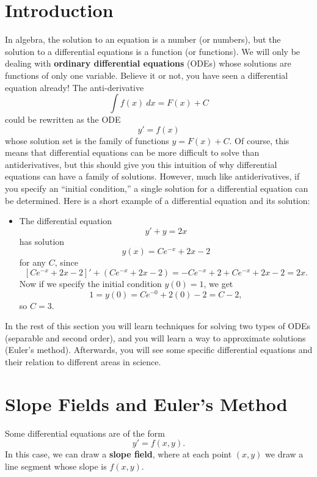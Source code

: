 
\section{Introduction}

In algebra, the solution to an equation is a number (or numbers), but the solution to a differential equations is a function (or functions). We will only be dealing with \textbf{ordinary differential equations} (ODEs) whose solutions are functions of only one variable. Believe it or not, you have seen a differential equation already! The anti-derivative
$$\int f(x)\ dx = F(x)+C$$
could be rewritten as the ODE
$$y' = f(x)$$
whose solution set is the family of functions $y=F(x)+C$. Of course, this means that differential equations can be more difficult to solve than antiderivatives, but this should give you this intuition of why differential equations can have a family of solutions. However, much like antiderivatives, if you specify an ``initial condition,'' a single solution for a differential equation can be determined. Here is a short example of a differential equation and its solution:
\begin{itemize}
\item The differential equation
$$y' + y = 2x$$
has solution 
$$y(x) = C e^{-x} + 2 x - 2$$
for any $C$, since
$$
\left[C e^{-x} + 2 x - 2\right]'+\left(C e^{-x} + 2 x - 2\right)=
-C e^{-x} + 2+ C e^{-x} + 2 x - 2 = 2x.
$$
Now if we specify the initial condition $y(0)=1$, we get
$$ 1=y(0)=C e^{-0} + 2 (0) - 2 = C - 2,$$
so $C=3$.
\end{itemize}

In the rest of this section you will learn techniques for solving two types of ODEs (separable and second order), and you will learn a way to approximate solutions (Euler's method). Afterwards, you will see some specific differential equations and their relation to different areas in science.


\section{Slope Fields and Euler's Method}

Some differential equations are of the form 
$$y'=f(x,y).$$
In this case, we can draw a \textbf{slope field}, where at each point $(x,y)$ we draw a line segment whose slope is $f(x,y)$. 

